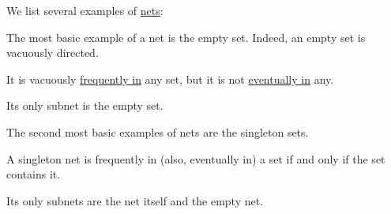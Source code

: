 \begin{example}\label{ex:def:topological_net}
  We list several examples of \hyperref[def:topological_net]{nets}:
  \begin{thmenum}
     The most basic example of a net is the empty set. Indeed, an empty set is vacuously directed.

    It is vacuously \hyperref[def:topological_net/frequently_in]{frequently in} any set, but it is not \hyperref[def:topological_net/eventually_in]{eventually in} any.

    Its only subnet is the empty set.

     The second most basic examples of nets are the singleton sets.

    A singleton net is frequently in (also, eventually in) a set if and only if the set contains it.

    Its only subnets are the net itself and the empty net.
  \end{thmenum}
\end{example}

